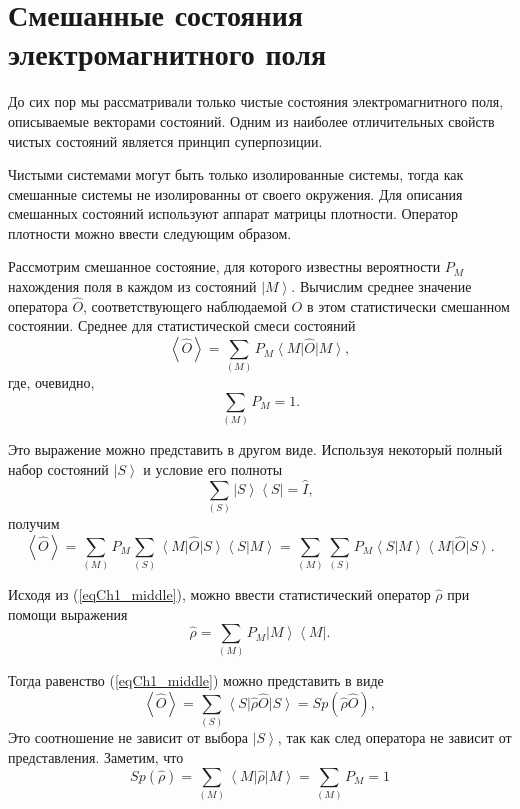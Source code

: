 \section{Смешанные состояния электромагнитного поля}
До сих пор мы рассматривали только чистые состояния электромагнитного
поля, описываемые векторами состояний. 
Одним из наиболее отличительных свойств чистых состояний является
принцип суперпозиции. 

Чистыми системами могут быть только изолированные системы, тогда как
смешанные системы не изолированны от своего окружения. Для описания
смешанных состояний используют аппарат матрицы плотности. Оператор
плотности можно ввести следующим образом.  

Рассмотрим смешанное состояние, для которого известны вероятности
$P_M$
нахождения поля в каждом из состояний 
$\left|M\right>$.  Вычислим среднее значение
оператора $\hat{O}$,  соответствующего наблюдаемой $O$ в этом статистически
смешанном состоянии. Среднее для статистической смеси состояний  
\begin{equation}
\left<\hat{O}\right> = \sum_{(M)} P_M\left<M\right|\hat{O}\left|M\right>,
\end{equation}
где, очевидно, 
\[
\sum_{(M)} P_M = 1.
\]

Это выражение можно представить в другом виде. Используя некоторый
полный набор состояний $\left|S\right>$   и условие его полноты 
\[
\sum_{(S)}\left|S\right>\left<S\right| = \hat{I},
\]
получим
\begin{equation}
\left<\hat{O}\right> = \sum_{(M)}
P_M\sum_{(S)}\left<M\right|\hat{O}\left|S\right>\left<S\right|\left.M\right>
= \sum_{(M)}\sum_{(S)}P_M\left<S\right|\left.M\right>\left<M\right|\hat{O}\left|S\right>.
\label{eqCh1_middle}
\end{equation}

Исходя из (\ref{eqCh1_middle}), можно ввести статистический оператор $\hat{\rho}$  при помощи выражения
\begin{equation}
\hat{\rho} = \sum_{(M)}
P_M\left|M\right>\left<M\right|.
\end{equation}

Тогда равенство (\ref{eqCh1_middle}) можно представить в виде
\begin{equation}
\left<\hat{O}\right> = \sum_{(S)}
\left<S\right|\hat{\rho}\hat{O}\left|S\right> = Sp \left(\hat{\rho}\hat{O}\right),
\end{equation}
Это соотношение не зависит от выбора  $\left|S\right>$,  так как след
оператора не зависит от представления. Заметим, что 
\begin{equation}
Sp \left(\hat{\rho}\right) = \sum_{(M)}
\left<M\right|\hat{\rho}\left|M\right> = \sum_{(M)} P_M = 1
\label{eqCh1_spequal1}
\end{equation}


